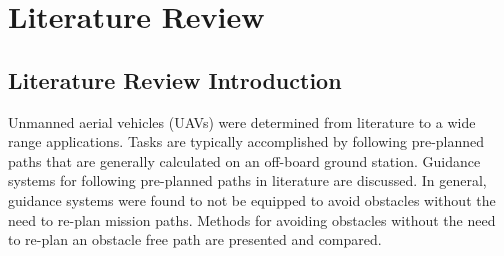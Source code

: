 \documentclass[numbered,pdftex]{ohio-etd}
\begin{document}
 
 
\chapter{Literature Review}
\section{Literature Review Introduction}

Unmanned aerial vehicles (UAVs) were determined from literature to a wide range applications. Tasks are typically accomplished by following pre-planned paths that are generally calculated on an off-board ground station. Guidance systems for following pre-planned paths in literature are discussed. In general, guidance systems were found to not be equipped to avoid obstacles without the need to re-plan mission paths. Methods for avoiding obstacles without the need to re-plan an obstacle free path are presented and compared.
\end{document}
